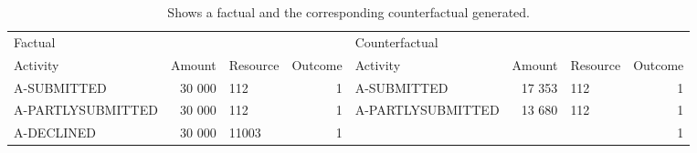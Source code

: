 \begin{table}
\caption{Shows a factual and the corresponding counterfactual generated.}
\label{tbl:example-cf}
\begin{tabular}{lrlrlrlr}
\toprule
\multicolumn{4}{l}{Factual} & \multicolumn{4}{l}{Counterfactual} \\
Activity & Amount & Resource & Outcome & Activity & Amount & Resource & Outcome \\
\midrule
A-SUBMITTED & 30 000 & 112 & 1 & A-SUBMITTED & 17 353 & 112 & 1 \\
A-PARTLYSUBMITTED & 30 000 & 112 & 1 & A-PARTLYSUBMITTED & 13 680 & 112 & 1 \\
A-DECLINED & 30 000 & 11003 & 1 &  &  &  & 1 \\
\bottomrule
\end{tabular}
\end{table}
